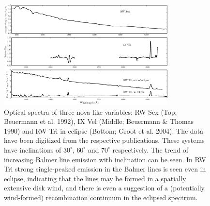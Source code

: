 \documentclass[preprint, a4paper, 11pt]{aastex}
\begin{document}



\begin{figure}	%
\centering
\includegraphics[width=0.8\textwidth]{figures/fig1.eps}
\caption{Optical spectra of three nova-like variables: 
RW Sex (Top; Beuermann et al. 1992),
IX Vel (Middle; Beuermann \& Thomas 1990)
and RW Tri in eclipse (Bottom; Groot et al. 2004).
The data have been digitized from the respective publications. 
These systems have inclinations of $30^\circ$, $60^\circ$ and $70^\circ$ 
respectively.
The trend of increasing Balmer line emission with inclination can be seen.
In RW Tri strong single-peaked emission in the Balmer lines is seen even
in eclipse, indicating that the lines may be formed in a spatially extensive disk wind, and there is even a suggestion
of a (potentially wind-formed) recombination continuum in the eclipsed spectrum.}
\label{novalikes}
\end{figure}
\end{document}
